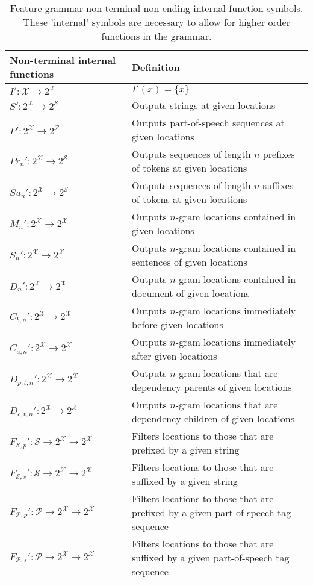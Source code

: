 \documentclass[11pt,letterpaper]{article}
\begin{document}
\begin{table}[H]
\begin{tabular}{ |l|l| }
  \hline
  \textbf{Non-terminal internal functions }           & \textbf{Definition} \\
  \hline
  $I':\mathcal{X}\rightarrow 2^{\mathcal{X}}$     & $I'(x)=\{x\}$ \\
  $S':2^{\mathcal{X}}\rightarrow 2^{\mathcal{S}}$ & Outputs strings at given locations \\  
  $P':2^{\mathcal{X}}\rightarrow 2^{\mathcal{P}}$ & Outputs part-of-speech sequences at given locations \\  
  $Pr_n':2^{\mathcal{X}}\rightarrow 2^{\mathcal{S}}$ & Outputs sequences of length $n$ prefixes of tokens at given locations \\  
  $Su_n':2^{\mathcal{X}}\rightarrow 2^{\mathcal{S}}$ & Outputs sequences of length $n$ suffixes of tokens at given locations \\    
  $M_n':2^{\mathcal{X}}\rightarrow 2^{\mathcal{X}}$ & Outputs $n$-gram locations contained in given locations \\
  $S_n':2^{\mathcal{X}}\rightarrow 2^{\mathcal{X}}$ & Outputs $n$-gram locations contained in sentences of given locations \\
  $D_n':2^{\mathcal{X}}\rightarrow 2^{\mathcal{X}}$ & Outputs $n$-gram locations contained in document of given locations \\  
  $C_{b,n}':2^{\mathcal{X}}\rightarrow 2^{\mathcal{X}}$ & Outputs $n$-gram locations immediately before given locations \\
  $C_{a,n}':2^{\mathcal{X}}\rightarrow 2^{\mathcal{X}}$ & Outputs $n$-gram locations immediately after given locations \\
  $D_{p,t,n}':2^{\mathcal{X}}\rightarrow 2^{\mathcal{X}}$ & Outputs $n$-gram locations that are dependency parents of given locations \\
  $D_{c,t,n}':2^{\mathcal{X}}\rightarrow 2^{\mathcal{X}}$ & Outputs $n$-gram locations that are dependency children of given locations \\ 
  $F_{\mathcal{S},p}':\mathcal{S}\rightarrow2^{\mathcal{X}}\rightarrow 2^{\mathcal{X}}$ & Filters locations to those that are prefixed by a given string \\  
  $F_{\mathcal{S},s}':\mathcal{S}\rightarrow 2^{\mathcal{X}}\rightarrow 2^{\mathcal{X}}$ & Filters locations to those that are suffixed by a given string \\  
  $F_{\mathcal{P},p}':\mathcal{P}\rightarrow 2^{\mathcal{X}}\rightarrow 2^{\mathcal{X}}$ & Filters locations to those that are prefixed by a given part-of-speech tag sequence \\  
  $F_{\mathcal{P},s}':\mathcal{P}\rightarrow 2^{\mathcal{X}}\rightarrow 2^{\mathcal{X}}$ & Filters locations to those that are suffixed by a given part-of-speech tag sequence \\  
  \hline
\end{tabular}
\caption{\label{tab:non-term-non-ending} Feature grammar
non-terminal non-ending internal function symbols. 
These 'internal' symbols are necessary to allow for
higher order functions in the grammar.} 
\end{table}
\end{document}
